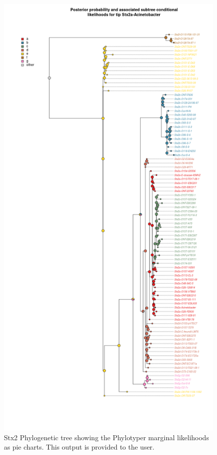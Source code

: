 \documentclass[11pt,letterpaper]{article}
\begin{document}
\begin{figure}[h!]
\centering
\includegraphics[scale=0.42,trim={0 3cm 0 3.5cm},clip]{sfig01.png}
\caption{Stx2 Phylogenetic tree showing the Phylotyper marginal likelihoods as pie charts. This output is provided to the user.}
\end{figure}
\end{document}
